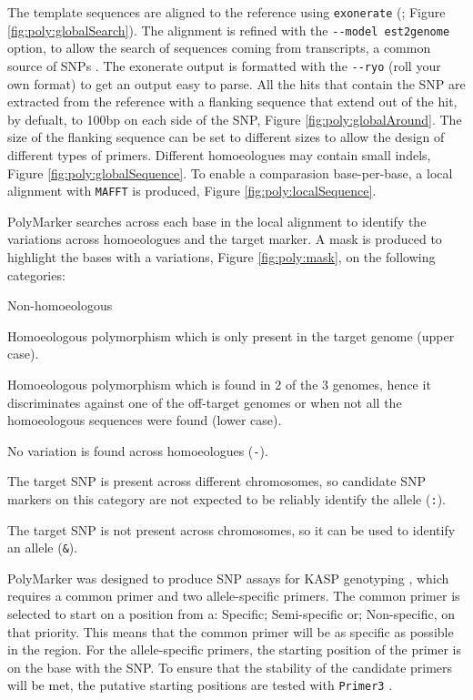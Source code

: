The template sequences are aligned to the reference using \verb|exonerate| (\citealt{Slater2005}; Figure \ref{fig:poly:globalSearch}). 
The alignment is refined with the \verb|--model est2genome| option, to allow the search of sequences coming from transcripts, a common source of SNPs \citep{Allen2011}. 
The exonerate output is formatted with the \verb|--ryo| (roll your own format) to get an output easy to parse. 
All the hits that contain the SNP are extracted from the reference with a flanking sequence that extend out of the hit, by defualt, to 100bp on each side of the SNP, Figure \ref{fig:poly:globalAround}.
The size of the flanking sequence can be set to different sizes to allow the design of different types of primers. 
Different homoeologues may contain small indels, Figure \ref{fig:poly:globalSequence}. 
To enable a comparasion base-per-base, a local alignment with \verb|MAFFT| \citep{Katoh2013} is produced, Figure \ref{fig:poly:localSequence}. 

PolyMarker searches across each base in the local alignment to identify the variations across homoeologues and the target marker.
A mask is produced to highlight the bases with a variations, Figure \ref{fig:poly:mask}, on the following categories:
\begin{labeling}{Non-homoeologous}
\item [Specific] Homoeologous polymorphism which is only present in the target genome (upper case).
\item [Semi-specific] Homoeologous polymorphism which is found in 2 of the 3 genomes, hence it discriminates against one of the off-target genomes or when not all the homoeologous sequences were found (lower case).
\item [Non-specific] No variation is found across homoeologues (\texttt{-}).
\item [Homoeologous] The target SNP is present across different chromosomes, so candidate SNP markers on this category are not expected to be reliably identify the allele (\texttt{:}).
\item [Non-homoeologous] The target SNP is not present across chromosomes, so it can be used to identify an allele (\texttt{\&}).
\end{labeling} 

PolyMarker was designed to produce SNP assays for KASP genotyping \citep{LGC}, which requires a common primer and two allele-specific primers. 
The common primer is selected to start on a position from a: Specific; Semi-specific or; Non-specific, on that priority. 
This means that the common primer will be as specific as possible in the region. 
For the allele-specific primers, the starting position of the primer is on the base with the SNP. 
To ensure that the stability of the candidate primers will be met, the putative starting positions are tested with \texttt{Primer3} \citep{Rozen}. 

